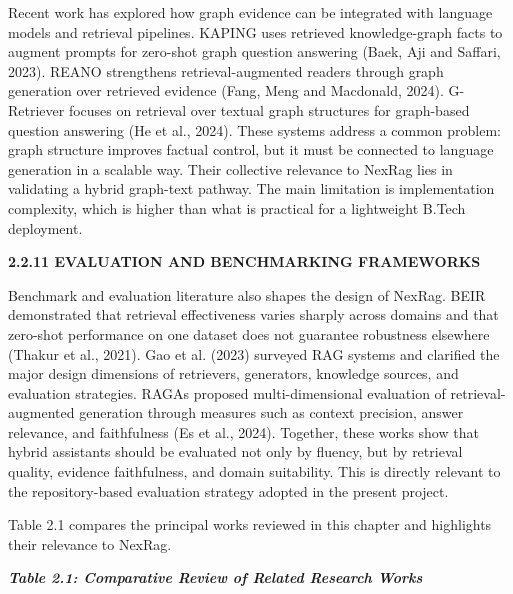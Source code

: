 Recent work has explored how graph evidence can be integrated with language models and retrieval pipelines. KAPING uses retrieved knowledge-graph facts to augment prompts for zero-shot graph question answering (Baek, Aji and Saffari, 2023). REANO strengthens retrieval-augmented readers through graph generation over retrieved evidence (Fang, Meng and Macdonald, 2024). G-Retriever focuses on retrieval over textual graph structures for graph-based question answering (He et al., 2024). These systems address a common problem: graph structure improves factual control, but it must be connected to language generation in a scalable way. Their collective relevance to NexRag lies in validating a hybrid graph-text pathway. The main limitation is implementation complexity, which is higher than what is practical for a lightweight B.Tech deployment.

\noindent\textbf{2.2.11 EVALUATION AND BENCHMARKING FRAMEWORKS}

Benchmark and evaluation literature also shapes the design of NexRag. BEIR demonstrated that retrieval effectiveness varies sharply across domains and that zero-shot performance on one dataset does not guarantee robustness elsewhere (Thakur et al., 2021). Gao et al. (2023) surveyed RAG systems and clarified the major design dimensions of retrievers, generators, knowledge sources, and evaluation strategies. RAGAs proposed multi-dimensional evaluation of retrieval-augmented generation through measures such as context precision, answer relevance, and faithfulness (Es et al., 2024). Together, these works show that hybrid assistants should be evaluated not only by fluency, but by retrieval quality, evidence faithfulness, and domain suitability. This is directly relevant to the repository-based evaluation strategy adopted in the present project.

\label{sec:literature-comparative-analysis}

Table 2.1 compares the principal works reviewed in this chapter and highlights their relevance to NexRag.

\begin{center}
\normalsize \textbf{\textit{Table 2.1: Comparative Review of Related Research Works}}
\end{center}
\label{tab:literature-comparison}

